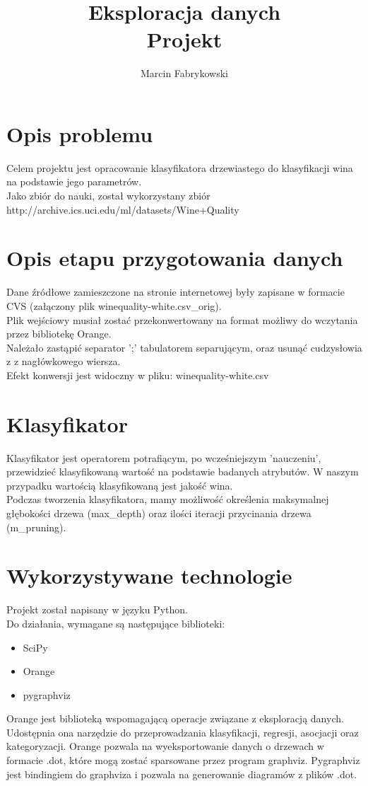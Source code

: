 \documentclass[a4paper,12pt]{article}
\author{Marcin Fabrykowski}
\title{Eksploracja danych\\Projekt}
\begin{document}
\maketitle
\newpage
\tableofcontents
\newpage
\section{Opis problemu}
Celem projektu jest opracowanie klasyfikatora drzewiastego do klasyfikacji wina na podstawie jego parametrów.\\
Jako zbiór do nauki, został wykorzystany zbiór\\
http://archive.ics.uci.edu/ml/datasets/Wine+Quality
\section{Opis etapu przygotowania danych}
Dane źródłowe zamieszczone na stronie internetowej były zapisane w formacie CVS (załączony plik winequality-white.csv\_orig).\\
Plik wejściowy musiał zostać przekonwertowany na format możliwy do wczytania przez bibliotekę Orange.\\
Należało zastąpić separator ';' tabulatorem separującym, oraz usunąć cudzysłowia z z nagłówkowego wiersza.\\
Efekt konwersji jest widoczny w pliku: winequality-white.csv
\section{Klasyfikator}
Klasyfikator jest operatorem potrafiącym, po wcześniejszym 'nauczeniu', przewidzieć klasyfikowaną wartość na podstawie badanych atrybutów. W naszym przypadku wartością klasyfikowaną jest jakość wina.\\
Podczas tworzenia klasyfikatora, mamy możliwość określenia maksymalnej głębokości drzewa (max\_depth) oraz ilości iteracji przycinania drzewa (m\_pruning).
\section{Wykorzystywane technologie}
Projekt został napisany w języku Python.\\
Do działania, wymagane są następujące biblioteki:
\begin{itemize}
\item SciPy
\item Orange
\item pygraphviz
\end{itemize}
Orange jest biblioteką wspomagającą operacje związane z eksploracją danych. Udostępnia ona narzędzie do przeprowadzania klasyfikacji, regresji, asocjacji oraz kategoryzacji. Orange pozwala na wyeksportowanie danych o drzewach w formacie .dot, które mogą zostać sparsowane przez program graphviz.
Pygraphviz jest bindingiem do graphviza i pozwala na generowanie diagramów z plików .dot.
\end{document}
